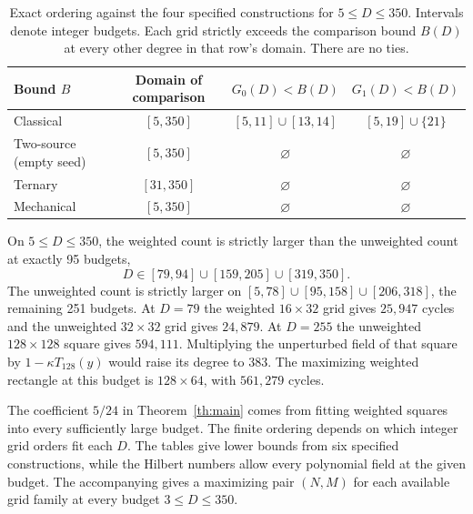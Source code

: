 \begin{table}[htbp]
\caption{Exact ordering against the four specified constructions for \(5\le D\le350\). Intervals denote integer budgets. Each grid strictly exceeds the comparison bound \(B(D)\) at every other degree in that row's domain. There are no ties.}\label{tab:order}
\centering\small
\begin{tabular}{@{}lccc@{}}
\toprule
Bound \(B\)&Domain of comparison&\(G_0(D)<B(D)\)&\(G_1(D)<B(D)\)\\
\midrule
Classical&\([5,350]\)&\([5,11]\cup[13,14]\)&\([5,19]\cup\{21\}\)\\
Two-source (empty seed)&\([5,350]\)&\(\varnothing\)&\(\varnothing\)\\
Ternary&\([31,350]\)&\(\varnothing\)&\(\varnothing\)\\
Mechanical&\([5,350]\)&\(\varnothing\)&\(\varnothing\)\\
\bottomrule
\end{tabular}
\end{table}

On \(5\le D\le350\), the weighted count is strictly larger than the unweighted count at exactly 95 budgets,
\[
 D\in [79,94]\cup[159,205]\cup[319,350].
\]
The unweighted count is strictly larger on \([5,78]\cup[95,158]\cup[206,318]\), the remaining 251 budgets. At \(D=79\) the weighted \(16\times32\) grid gives \(25{,}947\) cycles and the unweighted \(32\times32\) grid gives \(24{,}879\). At \(D=255\) the unweighted \(128\times128\) square gives \(594{,}111\). Multiplying the unperturbed field of that square by \(1-\kappa T_{128}(y)\) would raise its degree to 383. The maximizing weighted rectangle at this budget is \(128\times64\), with \(561{,}279\) cycles.

The coefficient \(5/24\) in Theorem~\ref{th:main} comes from fitting weighted squares into every sufficiently large budget. The finite ordering depends on which integer grid orders fit each \(D\). The tables give lower bounds from six specified constructions, while the Hilbert numbers allow every polynomial field at the given budget. The accompanying  gives a maximizing pair \((N,M)\) for each available grid family at every budget \(3\le D\le350\).
